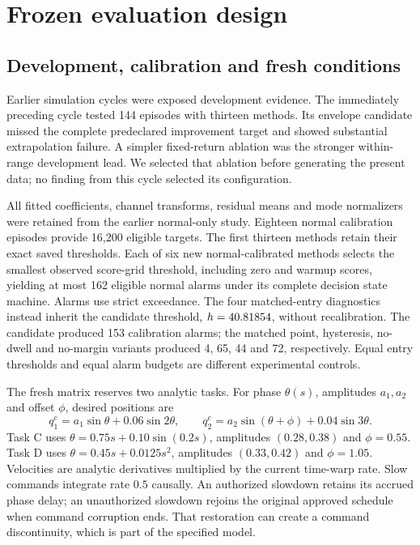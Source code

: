 \section{Frozen evaluation design}
\subsection{Development, calibration and fresh conditions}
Earlier simulation cycles were exposed development evidence. The immediately preceding cycle tested 144 episodes with thirteen methods. Its envelope candidate missed the complete predeclared improvement target and showed substantial extrapolation failure. A simpler fixed-return ablation was the stronger within-range development lead. We selected that ablation before generating the present data; no finding from this cycle selected its configuration.

All fitted coefficients, channel transforms, residual means and mode normalizers were retained from the earlier normal-only study. Eighteen normal calibration episodes provide 16,200 eligible targets. The first thirteen methods retain their exact saved thresholds. Each of six new normal-calibrated methods selects the smallest observed score-grid threshold, including zero and warmup scores, yielding at most 162 eligible normal alarms under its complete decision state machine. Alarms use strict exceedance. The four matched-entry diagnostics instead inherit the candidate threshold, $h=40.81854$, without recalibration. The candidate produced 153 calibration alarms; the matched point, hysteresis, no-dwell and no-margin variants produced 4, 65, 44 and 72, respectively. Equal entry thresholds and equal alarm budgets are different experimental controls.

The fresh matrix reserves two analytic tasks. For phase $\theta(s)$, amplitudes $a_1,a_2$ and offset $\phi$, desired positions are
\begin{equation}
 q_1^c=a_1\sin\theta+0.06\sin2\theta,\qquad
 q_2^c=a_2\sin(\theta+\phi)+0.04\sin3\theta.
\end{equation}
Task C uses $\theta=0.75s+0.10\sin(0.2s)$, amplitudes $(0.28,0.38)$ and $\phi=0.55$. Task D uses $\theta=0.45s+0.0125s^2$, amplitudes $(0.33,0.42)$ and $\phi=1.05$. Velocities are analytic derivatives multiplied by the current time-warp rate. Slow commands integrate rate $0.5$ causally. An authorized slowdown retains its accrued phase delay; an unauthorized slowdown rejoins the original approved schedule when command corruption ends. That restoration can create a command discontinuity, which is part of the specified model.

